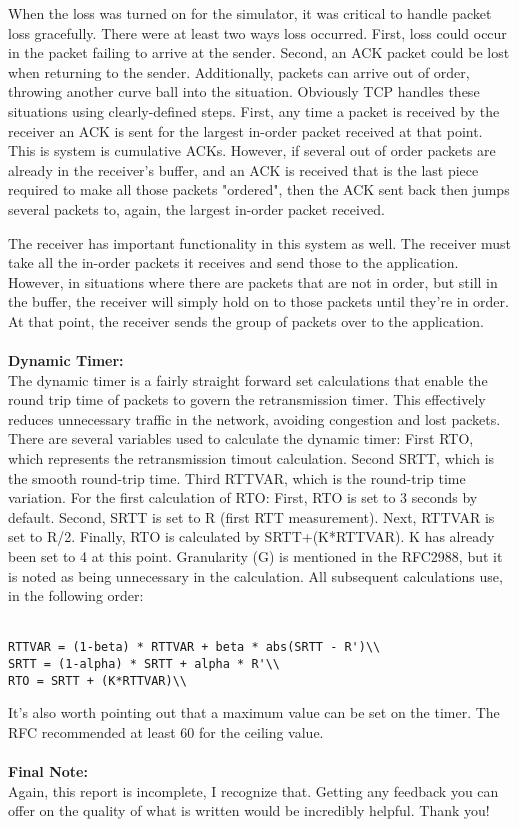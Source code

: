 \documentclass[11pt]{article}
\begin{document}
When the loss was turned on for the simulator, it was critical to handle packet loss gracefully. There were at least two ways loss occurred. First, loss could occur in the packet failing to arrive at the sender. Second, an ACK packet could be lost when returning to the sender. Additionally, packets can arrive out of order, throwing another curve ball into the situation. Obviously TCP handles these situations using clearly-defined steps. First, any time a packet is received by the receiver an ACK is sent for the largest in-order packet received at that point. This is system is cumulative ACKs. However, if several out of order packets are already in the receiver's buffer, and an ACK is received that is the last piece required to make all those packets "ordered", then the ACK sent back then jumps several packets to, again, the largest in-order packet received.

The receiver has important functionality in this system as well. The receiver must take all the in-order packets it receives and send those to the application. However, in situations where there are packets that are not in order, but still in the buffer, the receiver will simply hold on to those packets until they're in order. At that point, the receiver sends the group of packets over to the application.\\\\
\large\textbf{Dynamic Timer:}\\
The dynamic timer is a fairly straight forward set calculations that enable the round trip time of packets to govern the retransmission timer. This effectively reduces unnecessary traffic in the network, avoiding congestion and lost packets. There are several variables used to calculate the dynamic timer: First RTO, which represents the retransmission timout calculation. Second SRTT, which is the smooth round-trip time. Third RTTVAR, which is the round-trip time variation. For the first calculation of RTO: First, RTO is set to 3 seconds by default. Second, SRTT is set to R (first RTT measurement). Next, RTTVAR is set to R/2. Finally, RTO is calculated by SRTT+(K*RTTVAR). K has already been set to 4 at this point. Granularity (G) is mentioned in the RFC2988, but it is noted as being unnecessary in the calculation. All subsequent calculations use, in the following order:\\\\
\begin{verbatim}
RTTVAR = (1-beta) * RTTVAR + beta * abs(SRTT - R')\\
SRTT = (1-alpha) * SRTT + alpha * R'\\
RTO = SRTT + (K*RTTVAR)\\
\end{verbatim}
It's also worth pointing out that a maximum value can be set on the 	timer. The RFC recommended at least 60 for the ceiling value.\\\\
\large\textbf{Final Note:}\\
Again, this report is incomplete, I recognize that. Getting any feedback you can offer on the quality of what is written would be incredibly helpful. Thank you!
\end{document}
